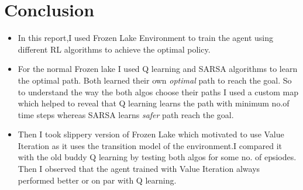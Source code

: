 \documentclass[journal,12pt,onecolumn]{IEEEtran}
\theoremstyle{remark}
\numberwithin{equation}{section}
\begin{document}
  \section{Conclusion}
    \begin{itemize}
       \item In this report,I used Frozen Lake Environment to train the agent using different RL algorithms to achieve the optimal policy. 
       \item For the normal Frozen lake I used Q learning and SARSA algorithms to learn the optimal path. Both learned their own \textit{optimal} path to reach the goal. So to understand the way the both algos choose their paths I used a custom map which helped to reveal that Q learning learns the path with minimum no.of time steps whereas SARSA learns \textit{safer} path reach the goal.
       \item Then I took slippery version of Frozen Lake which motivated to use Value Iteration as it uses the transition model of the environment.I compared it with the old buddy Q learning by testing both algos for some no. of epsiodes. Then I observed that the agent trained with Value Iteration always performed better or on par with Q learning.
    \end{itemize}
       
\end{document}
